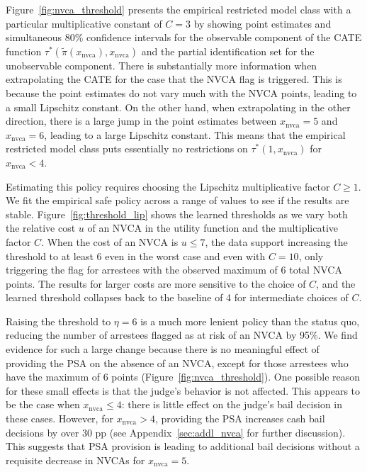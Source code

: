 \documentclass[12pt]{article}
\theoremstyle{definition}
\newcommand{\<}{\langle}
\renewcommand{\>}{\rangle}
\begin{document}
Figure~\ref{fig:nvca_threshold} presents the empirical restricted
model class with a particular multiplicative constant of $C=3$ by
showing point estimates and simultaneous 80\% confidence intervals for
the observable component of the CATE function
$\tau^\ast(\tilde{\pi}(x_\text{nvca}), x_\text{nvca})$ and the partial
identification set for the unobservable component. There is
substantially more information when extrapolating the CATE for the
case that the NVCA flag is triggered. This is because the point
estimates do not vary much with the NVCA points, leading to a small
Lipschitz constant.  On the other hand, when extrapolating in the
other direction, there is a large jump in the point estimates between
$x_\text{nvca} = 5$ and $x_\text{nvca} = 6$, leading to a large
Lipschitz constant.  This means that the empirical restricted model
class puts essentially no restrictions on
$\tau^\ast(1, x_\text{nvca})$ for $x_\text{nvca} < 4$.






Estimating this policy requires choosing the Lipschitz
multiplicative factor $C \geq
1$.
We fit the empirical safe policy across a range of values to see if
the results are stable.  Figure~\ref{fig:threshold_lip} shows the
learned thresholds as we vary both the relative cost $u$ of an NVCA
in the utility function and the
multiplicative factor $C$.  When the cost of an NVCA is $u \leq 7$, the data support increasing the threshold to at least 6 even
in the worst case and even with $C = 10$, only triggering the flag for
arrestees with the observed maximum of 6 total NVCA points. The
results for larger costs are more sensitive to the choice of $C$, and
the learned threshold collapses back to the baseline of 4 for
intermediate choices of $C$.


Raising the threshold to $\eta = 6$ is a much more lenient policy than the
status quo,
reducing the number of arrestees flagged as at risk of an
NVCA by 95\%.
We find evidence for such a large change because there is no meaningful effect of
providing the PSA on the absence of an NVCA, except for those arrestees who have
the maximum of 6 points (Figure~\ref{fig:nvca_threshold}).
One possible reason for these small effects is that the judge's behavior is not affected.
This appears to be the case when $x_\text{nvca} \leq 4$: there is little effect
on the judge's bail decision in these cases.
However, for $x_\text{nvca} > 4$, providing the PSA increases cash bail decisions
by over 30 pp (see Appendix~\ref{sec:addl_nvca} for further discussion).
This suggests that PSA provision is leading to additional bail decisions without
a requisite decrease in NVCAs for $x_\text{nvca} = 5$.
\end{document}
